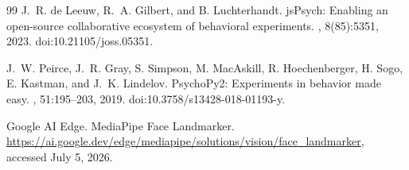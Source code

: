 \documentclass[dvipdfmx]{ehis}
\begin{document}
{\begin{thebibliography}{99}
J.~R. de Leeuw, R.~A. Gilbert, and B. Luchterhandt.
\newblock jsPsych: Enabling an open-source collaborative ecosystem of behavioral experiments.
, 8(85):5351, 2023.
\newblock doi:10.21105/joss.05351.

J.~W. Peirce, J.~R. Gray, S. Simpson, M. MacAskill, R. Hoechenberger, H. Sogo, E. Kastman, and J.~K. Lindelov.
\newblock PsychoPy2: Experiments in behavior made easy.
, 51:195--203, 2019.
\newblock doi:10.3758/s13428-018-01193-y.

Google AI Edge.
\newblock MediaPipe Face Landmarker.
\newblock \url{https://ai.google.dev/edge/mediapipe/solutions/vision/face_landmarker}, accessed July 5, 2026.

\end{thebibliography}
}
\end{document}
